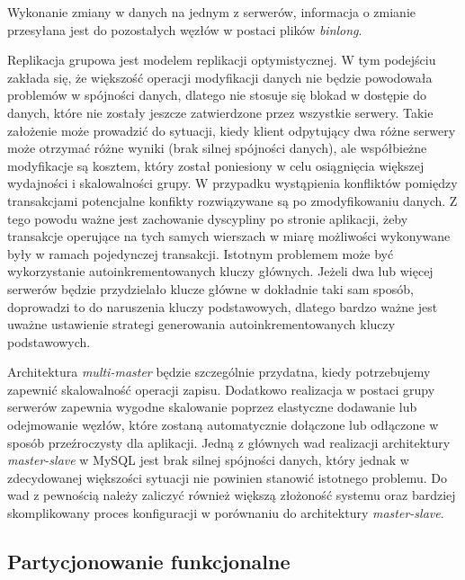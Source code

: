 Wykonanie zmiany w danych na jednym z serwerów, informacja o zmianie przesyłana jest do pozostałych węzłów w postaci plików \textit{binlong}.

Replikacja grupowa jest modelem replikacji optymistycznej. W tym podejściu zakłada się, że większość operacji modyfikacji danych nie będzie powodowała problemów w spójności danych, dlatego nie stosuje się blokad w dostępie do danych, które nie zostały jeszcze zatwierdzone przez wszystkie serwery. Takie założenie może prowadzić do sytuacji, kiedy klient odpytujący dwa różne serwery może otrzymać różne wyniki (brak silnej spójności danych), ale współbieżne modyfikacje są kosztem, który został poniesiony w celu osiągnięcia większej wydajności i skalowalności grupy. W przypadku wystąpienia konfliktów pomiędzy transakcjami potencjalne konfikty rozwiązywane są po zmodyfikowaniu danych. Z tego powodu ważne jest zachowanie dyscypliny po stronie aplikacji, żeby transakcje operujące na tych samych wierszach w miarę możliwości wykonywane były w ramach pojedynczej transakcji. Istotnym problemem może być wykorzystanie autoinkrementowanych kluczy głównych. Jeżeli dwa lub więcej serwerów będzie przydzielało klucze główne w dokładnie taki sam sposób, doprowadzi to do naruszenia kluczy podstawowych, dlatego bardzo ważne jest uważne ustawienie strategi generowania autoinkrementowanych kluczy podstawowych.

Architektura \textit{multi-master} będzie szczególnie przydatna, kiedy potrzebujemy zapewnić skalowalność operacji zapisu. Dodatkowo realizacja w postaci grupy serwerów zapewnia wygodne skalowanie poprzez elastyczne dodawanie lub odejmowanie węzłów, które zostaną automatycznie dołączone lub odłączone w sposób przeźroczysty dla aplikacji. Jedną z głównych wad realizacji architektury \textit{master-slave} w MySQL jest brak silnej spójności danych, który jednak w zdecydowanej większości sytuacji nie powinien stanowić istotnego problemu. Do wad z pewnością należy zaliczyć również większą złożoność systemu oraz bardziej skomplikowany proces konfiguracji w porównaniu do architektury \textit{master-slave}.


\subsection{Partycjonowanie funkcjonalne}

